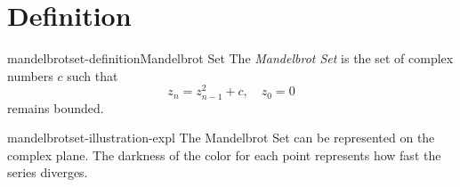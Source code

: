 \documentclass[preview]{standalone}
\begin{document}
\genpage

\section{Definition}

\begin{snippetdefinition}{mandelbrotset-definition}{Mandelbrot Set}
    The \textit{Mandelbrot Set} is the set of complex numbers \(c\) such that
    \[
        z_n = z_{n-1}^2 + c,\quad z_0=0
    \]
    remains bounded.
\end{snippetdefinition}

\begin{snippet}{mandelbrotset-illustration-expl}
The Mandelbrot Set can be represented on the complex plane.
The darkness of the color for each point
represents how fast the series diverges.
\end{snippet}

\end{document}
